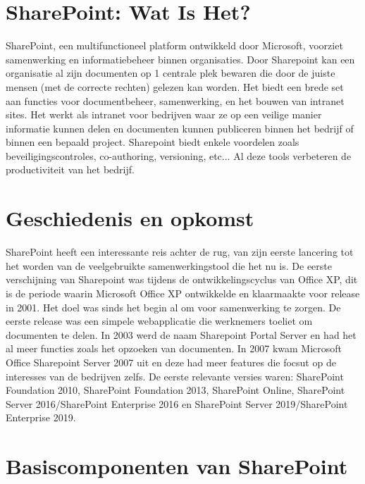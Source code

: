 \section{SharePoint: Wat Is Het?} 
SharePoint, een multifunctioneel platform ontwikkeld door Microsoft, voorziet samenwerking en informatiebeheer binnen organisaties. Door Sharepoint kan een organisatie al zijn documenten op 1 centrale plek bewaren die door de juiste mensen (met de correcte rechten) gelezen kan worden. Het biedt een brede set aan functies voor documentbeheer, samenwerking, en het bouwen van intranet sites. Het werkt als intranet voor bedrijven waar ze op een veilige manier informatie kunnen delen en  documenten kunnen publiceren binnen het bedrijf of binnen een bepaald project. Sharepoint biedt enkele voordelen zoals beveiligingscontroles, co-authoring, versioning, etc... Al deze tools verbeteren de productiviteit van het bedrijf. \autocite{Willis2024}

\section{Geschiedenis en opkomst} 
SharePoint heeft een interessante reis achter de rug, van zijn eerste lancering tot het worden van de veelgebruikte samenwerkingstool die het nu is. De eerste verschijning van Sharepoint was tijdens de ontwikkelingscyclus van Office XP, dit is de periode waarin Microsoft Office XP ontwikkelde en klaarmaakte voor release in 2001. \autocite{2014} Het doel was sinds het begin al om voor samenwerking te zorgen. De eerste release was een simpele webapplicatie die werknemers toeliet om documenten te delen. In 2003 werd de naam Sharepoint Portal Server en had het al meer functies zoals het opzoeken van documenten. In 2007 kwam Microsoft Office Sharepoint Server 2007 uit en deze had meer features die focsut op de interesses van de bedrijven zelfs. \autocite{Experts2023} De eerste relevante versies waren: SharePoint Foundation 2010, SharePoint Foundation 2013, SharePoint Online, SharePoint Server 2016/SharePoint Enterprise 2016 en SharePoint Server 2019/SharePoint Enterprise 2019. \autocite{Davenport2024} \autocite{Abramenko2016}

\section{Basiscomponenten van SharePoint}

